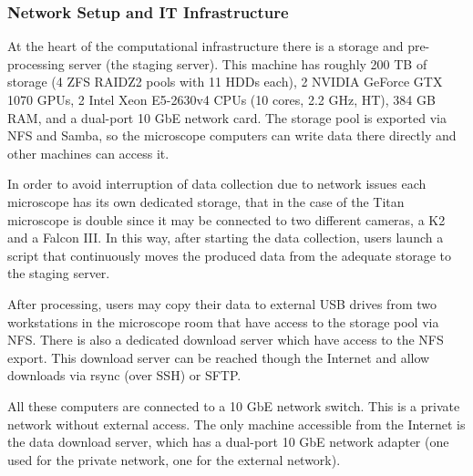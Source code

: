 \subsubsection{Network Setup and IT Infrastructure}
At the heart of the \scilifelab computational infrastructure there is a storage and pre-processing server (the staging server). This machine has roughly 200 TB of storage (4 ZFS RAIDZ2 pools with 11 HDDs each), 2 NVIDIA GeForce GTX 1070 GPUs, 2 Intel Xeon E5-2630v4 CPUs (10 cores, 2.2 GHz, HT), 384 GB RAM, and a dual-port 10 GbE network card. The storage pool is exported via NFS and Samba, so the microscope computers can write data there directly and other machines can access it.

In order to avoid interruption of data collection due to network issues each microscope has its own dedicated storage, that in the case of the Titan microscope is double since it may be connected to two different cameras, a K2 and a Falcon III.  In this way, after starting the data collection, users launch a script that continuously moves the produced data from the adequate storage to the staging server.

After processing, users may  copy their data to external USB drives from two workstations in the microscope room that have access to the storage pool via NFS.
There is also a dedicated download server which have access to the NFS export. This download server can be reached though the Internet and allow downloads via rsync (over SSH) or SFTP. 

All these computers are connected to a 10 GbE network switch. This is a private
network without external access. The only machine accessible from the Internet
is the data download server, which has a dual-port 10 GbE network adapter (one
used for the private network, one for the external network). %

